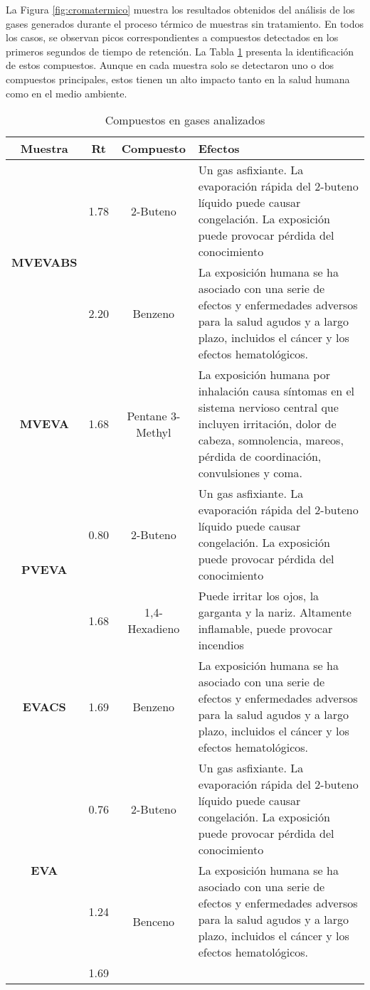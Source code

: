 La Figura \ref{fig:cromatermico} muestra los resultados obtenidos del análisis de los gases generados durante el proceso térmico de muestras sin tratamiento. En todos los casos, se observan picos correspondientes a compuestos detectados en los primeros segundos de tiempo de retención. La Tabla \ref{tab:resultados croma} presenta la identificación de estos compuestos. Aunque en cada muestra solo se detectaron uno o dos compuestos principales, estos tienen un alto impacto tanto en la salud humana como en el medio ambiente.

\begin{table}[htb]
	\caption{Compuestos en gases analizados}
	\vspace{-0.5em} %
	\label{tab:resultados croma}
	\begin{center}
		\begin{tabular}{|c||c|c|p{9cm}|}\hline
			\textbf{Muestra} &\textbf{Rt} & \textbf{Compuesto} & \textbf{Efectos}\\ \hline
			\multirow{2}{4em}{ \textbf{MVEVABS}}& {1.78} & 2-Buteno & Un gas asfixiante. La evaporación rápida del 2-buteno líquido puede causar congelación. La exposición puede provocar pérdida del conocimiento  \\ 
		   & {2.20} & Benzeno & La exposición humana se ha asociado con una serie de efectos y enfermedades adversos para la salud agudos y a largo plazo, incluidos el cáncer y los efectos hematológicos. \\ \hline
			\textbf{MVEVA} & {1.68} & Pentane 3-Methyl & La exposición humana por inhalación causa síntomas en el sistema nervioso central que incluyen irritación, dolor de cabeza, somnolencia, mareos, pérdida de coordinación, convulsiones y coma.\\ \hline
			\multirow{2}{4em}{ \textbf{PVEVA}} & {0.80} & 2-Buteno & Un gas asfixiante. La evaporación rápida del 2-buteno líquido puede causar congelación. La exposición puede provocar pérdida del conocimiento \\ 
			& {1.68} & 1,4-Hexadieno & Puede irritar los ojos, la garganta y la nariz. Altamente inflamable, puede provocar incendios \\ \hline
			\textbf{EVACS} & {1.69} & Benzeno & La exposición humana se ha asociado con una serie de efectos y enfermedades adversos para la salud agudos y a largo plazo, incluidos el cáncer y los efectos hematológicos. \\  \hline
			\multirow{3}{4em}{\textbf{EVA}} & {0.76} & 2-Buteno & Un gas asfixiante. La evaporación rápida del 2-buteno líquido puede causar congelación. La exposición puede provocar pérdida del conocimiento \\ 
			&{1.24} & \multirow{2}{4em}{Benceno} & La exposición humana se ha asociado con una serie de efectos y enfermedades adversos para la salud agudos y a largo plazo, incluidos el cáncer y los efectos hematológicos.\\  
			&{1.69} &  &  \\  \hline
							\end{tabular}
						\end{center}
					\end{table}

